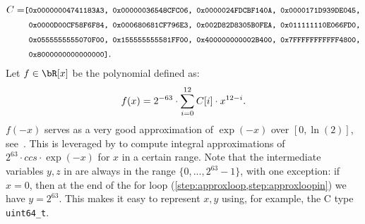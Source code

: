 \begin{align*}
C = & \footnotesize{\texttt{%
	[0x00000004741183A3, 0x00000036548CFC06, 0x0000024FDCBF140A, 0x0000171D939DE045,}} \\
	& \footnotesize{\texttt{%
	\ 0x0000D00CF58F6F84, 0x000680681CF796E3, 0x002D82D8305B0FEA, 0x011111110E066FD0,}}\\%
	& \footnotesize{\texttt{%
	\ 0x0555555555070F00, 0x155555555581FF00, 0x400000000002B400, 0x7FFFFFFFFFFF4800,}}\\%
	& \footnotesize{\texttt{%
	\ 0x8000000000000000]}}.%
\end{align*}
Let $f \in \bR[x]$ be the polynomial defined as:
$$f(x) = 2^{-63} \cdot \sum_{i=0}^{12} C[i] \cdot x^{12 - i}.$$
$f(-x)$ serves as a very good approximation of $\exp(-x)$ over $[0, \ln(2)]$, see~\cite{TC:ZhaSteSak20}. This is leveraged by \longapproxexp to compute integral approximations of $2^{63} \cdot ccs \cdot \exp(-x)$ for $x$ in a certain range. Note that the intermediate variables $y, z$ in \approxexp are always in the range $\{0, ..., 2^{63} - 1\}$, with one exception: if $x = 0$, then at the end of the for loop (\cref{step:approxloop,step:approxloopin}) we have $y = 2^{63}$. This makes it easy to represent $x,y$ using, for example, the C type \verb+uint64_t+. 


\begin{algorithm}[!htb]
	\caption{$\approxexp(x, ccs)$}\label{alg:approxexp}
	\begin{algorithmic}[1]
		\label{step:approxloop}
		\label{step:approxloopin}
		\EndFor
	\end{algorithmic}
\end{algorithm}

